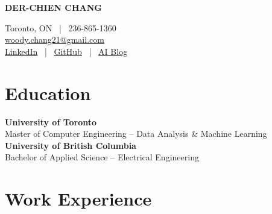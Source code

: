 \documentclass[10pt, letterpaper]{article}
\begin{document}
\noindent
\begin{minipage}[c]{0.35\textwidth} %
    {\LARGE \textbf{DER-CHIEN CHANG}}
\end{minipage}%
\hfill %
\begin{minipage}[c]{0.6\textwidth} %
    \raggedleft %
    Toronto, ON \ | \ 236-865-1360 \\ 
    \href{mailto:woodychang891121@gmail.com}{woody.chang21@gmail.com} \\ 
    \href{https://linkedin.com/in/woody-chang}{LinkedIn} \ | \ 
    \href{https://github.com/WoodyChang21}{GitHub} \ | \ 
    \href{https://woodychang21.github.io/Personal-Blog/}{AI Blog}
\end{minipage}


\section*{Education}
\noindent\textbf{University of Toronto} \hfill \text{2026}\\
Master of Computer Engineering – Data Analysis \& Machine Learning\\
\textbf{University of British Columbia} \hfill \text{2024}\\
Bachelor of Applied Science – Electrical Engineering


\section*{Work Experience}
\end{document}
